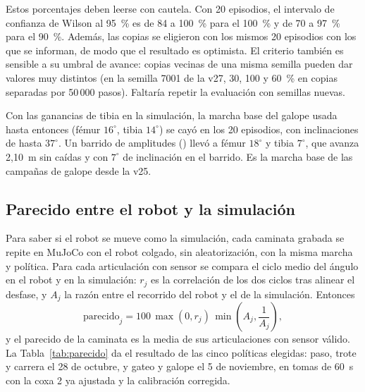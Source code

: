 Estos porcentajes deben leerse con cautela. Con 20 episodios, el intervalo de
confianza de Wilson al 95~\% es de 84 a 100~\% para el 100~\% y de 70 a 97~\% para
el 90~\%. Además, las copias se eligieron con los mismos 20 episodios con los que
se informan, de modo que el resultado es optimista. El criterio también es sensible
a su umbral de avance: copias vecinas de una misma semilla pueden dar valores muy
distintos (en la semilla 7001 de la v27, 30, 100 y 60~\% en copias separadas por
50\,000 pasos). Faltaría repetir la evaluación con semillas nuevas.

Con las ganancias de tibia en la simulación, la marcha base del galope usada hasta
entonces (fémur $16^\circ$, tibia $14^\circ$) se cayó en los 20 episodios, con
inclinaciones de hasta $37^\circ$. Un barrido de amplitudes
() llevó a fémur $18^\circ$ y tibia $7^\circ$, que avanza
2,10~m sin caídas y con $7^\circ$ de inclinación en el barrido. Es la marcha base de
las campañas de galope desde la v25.

\subsection{Parecido entre el robot y la simulación}
\label{sec:parecido-sim-real}

Para saber si el robot se mueve como la simulación, cada caminata grabada se repite en
MuJoCo con el robot colgado, sin aleatorización, con la misma marcha y política. Para
cada articulación con sensor se compara el ciclo medio del ángulo en el robot y en la
simulación: $r_j$ es la correlación de los dos ciclos tras alinear el desfase, y
$A_j$ la razón entre el recorrido del robot y el de la simulación. Entonces
\begin{equation}
    \text{parecido}_j = 100\,\max(0,r_j)\,\min\!\left(A_j,\frac{1}{A_j}\right),
    \label{eq:parecido}
\end{equation}
y el parecido de la caminata es la media de sus articulaciones con sensor válido. La
Tabla~\ref{tab:parecido} da el resultado de las cinco políticas elegidas: paso, trote y
carrera el 28 de octubre, y gateo y galope el 5 de noviembre, en tomas de 60~s con la
coxa 2 ya ajustada y la calibración corregida.

